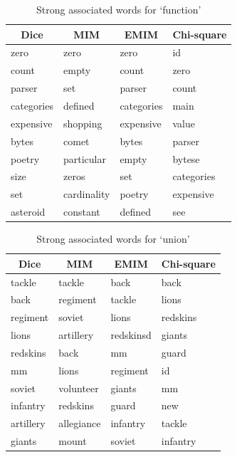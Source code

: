 \documentclass[letterpaper,11pt]{article}
\begin{document}
\begin{table}[H]
\centering
\begin{tabular}{|l|l|l|l|}
\hline
\multicolumn{1}{|c|}{\textbf{Dice}} & \multicolumn{1}{c|}{\textbf{MIM}} & \multicolumn{1}{c|}{\textbf{EMIM}} & \multicolumn{1}{c|}{\textbf{Chi-square}} \\ \hline
zero & zero & zero & id \\ \hline
count & empty & count & zero \\ \hline
parser & set & parser & count \\ \hline
categories & defined & categories & main \\ \hline
expensive & shopping & expensive & value \\ \hline
bytes & comet & bytes & parser \\ \hline
poetry & particular & empty & bytese \\ \hline
size & zeros & set & categories \\ \hline
set & cardinality & poetry & expensive \\ \hline
asteroid & constant & defined & see \\ \hline
\end{tabular}
\caption{Strong associated words for `function'}
\label{my-label}
\end{table}

\begin{table}[H]
\centering
\begin{tabular}{|l|l|l|l|}
\hline
\multicolumn{1}{|c|}{\textbf{Dice}} & \multicolumn{1}{c|}{\textbf{MIM}} & \multicolumn{1}{c|}{\textbf{EMIM}} & \multicolumn{1}{c|}{\textbf{Chi-square}} \\ \hline
tackle & tackle & back & back \\ \hline
back & regiment & tackle & lions \\ \hline
regiment & soviet & lions & redskins \\ \hline
lions & artillery & redskinsd & giants \\ \hline
redskins & back & mm & guard \\ \hline
mm & lions & regiment & id \\ \hline
soviet & volunteer & giants & mm \\ \hline
infantry & redskins & guard & new \\ \hline
artillery & allegiance & infantry & tackle \\ \hline
giants & mount & soviet & infantry \\ \hline
\end{tabular}
\caption{Strong associated words for `union'}
\label{my-label}
\end{table}
\end{document}
